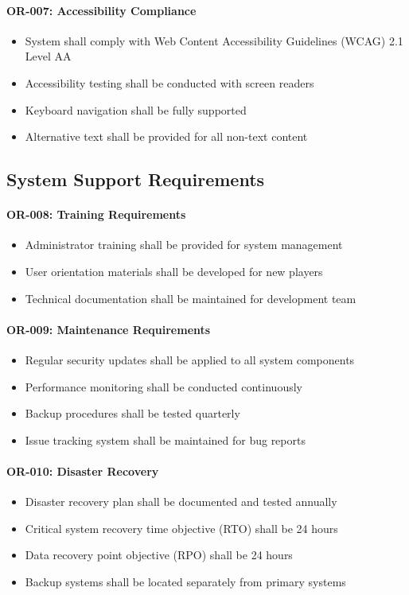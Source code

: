 \documentclass[12pt,a4paper]{article}
\begin{document}
\begin{enumerate}
\paragraph{OR-007: Accessibility Compliance}
\begin{itemize}
    \item System shall comply with Web Content Accessibility Guidelines (WCAG) 2.1 Level AA
    \item Accessibility testing shall be conducted with screen readers
    \item Keyboard navigation shall be fully supported
    \item Alternative text shall be provided for all non-text content
\end{itemize}

\subsection{System Support Requirements}

\paragraph{OR-008: Training Requirements}
\begin{itemize}
    \item Administrator training shall be provided for system management
    \item User orientation materials shall be developed for new players
    \item Technical documentation shall be maintained for development team
\end{itemize}

\paragraph{OR-009: Maintenance Requirements}
\begin{itemize}
    \item Regular security updates shall be applied to all system components
    \item Performance monitoring shall be conducted continuously
    \item Backup procedures shall be tested quarterly
    \item Issue tracking system shall be maintained for bug reports
\end{itemize}

\paragraph{OR-010: Disaster Recovery}
\begin{itemize}
    \item Disaster recovery plan shall be documented and tested annually
    \item Critical system recovery time objective (RTO) shall be 24 hours
    \item Data recovery point objective (RPO) shall be 24 hours
    \item Backup systems shall be located separately from primary systems
\end{itemize}


\end{enumerate}
\end{document}
